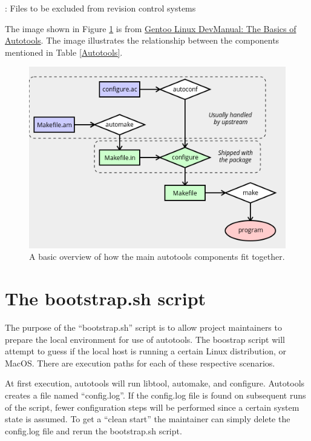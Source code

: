 \begin{mybox}[ht]{\thetcbcounter: Files to be excluded from revision control systems}
    
\end{mybox}
\vspace{2mm}



\justifying
The image shown in Figure \ref{diagram} is from \href{https://devmanual.gentoo.org/general-concepts/autotools/index.html}{Gentoo Linux DevManual: The Basics of Autotools}.
The image illustrates the relationship between the components mentioned in Table \ref{Autotools}.
\vspace{2mm}

\begin{figure}[ht]
    \includegraphics[width=12cm]{images/diagram.png}
    \caption{A basic overview of how the main autotools components fit together.}
    \label{diagram}
\end{figure}
\vspace{2mm}

\section{\label{sec:bootstrap}The bootstrap.sh script}

The purpose of the ``bootstrap.sh'' script is to allow project maintainers to prepare the local environment for use of autotools.
The boostrap script will attempt to guess if the local host is running a certain Linux distribution, or MacOS. There are execution
paths for each of these respective scenarios.

At first execution, autotools will run libtool, automake, and configure. Autotools creates a file named ``config.log''. If the config.log
file is found on subsequent runs of the script, fewer configuration steps will be performed since a certain system state is assumed. To
get a ``clean start'' the maintainer can simply delete the config.log file and rerun the bootstrap.sh script.

